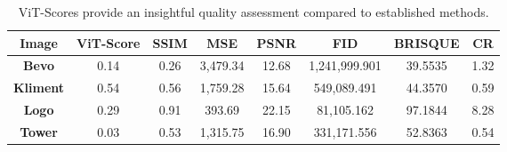 \begin{table}[H]
    \begin{center}
    \begin{tabular}{|c|c|c|c|c|c|c|c|}
    \hline
    \textbf{Image}	& \textbf{ViT-Score} & \textbf{SSIM} & \textbf{MSE} & \textbf{PSNR} & \textbf{FID}  & \textbf{BRISQUE} & \textbf{CR}\\
    \hline
    \textbf{Bevo}	 & 0.14 & 0.26 & 3,479.34  &  12.68  &  1,241,999.901  &  39.5535 & 1.32 \\
    \textbf{Kliment} & 0.54 & 0.56 & 1,759.28 & 15.64  &  549,089.491 & 44.3570 & 0.59\\
    \textbf{Logo}	 & 0.29 & 0.91 & 393.69 & 22.15 &  81,105.162 & 97.1844 & 8.28 \\
    \textbf{Tower}   & 0.03 & 0.53 & 1,315.75 & 16.90 &  331,171.556 & 52.8363 & 0.54\\\hline
    
    \end{tabular}
    \caption[Summary of Results]{ViT-Scores provide an insightful quality assessment compared to established methods.}
    \end{center}
    \end{table}
